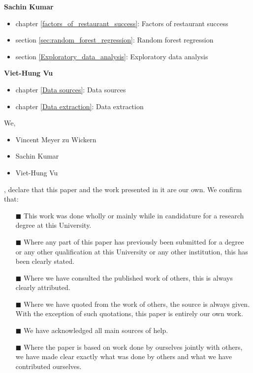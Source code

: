 \documentclass[a4paper, 11pt, oneside]{Thesis}  %
\begin{document}
\textbf{Sachin Kumar}
\begin{itemize}
\item chapter \ref{factors_of_restaurant_success}: Factors of restaurant success
\item section \ref{sec:random_forest_regression}: Random forest regression
\item section \ref{Exploratory_data_analysis}: Exploratory data analysis
\end{itemize}

\textbf{Viet-Hung Vu}
\begin{itemize}
\item chapter \ref{Data sources}: Data sources
\item chapter \ref{Data extraction}: Data extraction
\end{itemize}


\clearpage


We,
\begin{itemize}
\item Vincent Meyer zu Wickern
\item Sachin Kumar
\item Viet-Hung Vu
\end{itemize}
, declare that this paper and the work presented in it are our own. We confirm that:

\begin{itemize} 
\item[\tiny{$\blacksquare$}] This work was done wholly or mainly while in candidature for a research degree at this University.
 
\item[\tiny{$\blacksquare$}] Where any part of this paper has previously been submitted for a degree or any other qualification at this University or any other institution, this has been clearly stated.
 
\item[\tiny{$\blacksquare$}] Where we have consulted the published work of others, this is always clearly attributed.
 
\item[\tiny{$\blacksquare$}] Where we have quoted from the work of others, the source is always given. With the exception of such quotations, this paper is entirely our own work.
 
\item[\tiny{$\blacksquare$}] We have acknowledged all main sources of help.
 
\item[\tiny{$\blacksquare$}] Where the paper is based on work done by ourselves jointly with others, we have made clear exactly what was done by others and what we have contributed ourselves.
\\
\end{itemize}
 
\end{document}
